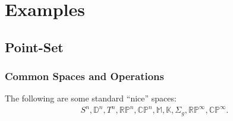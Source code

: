 
\hypertarget{examples}{%
\section{Examples}\label{examples}}

\hypertarget{point-set}{%
\subsection{Point-Set}\label{point-set}}

\hypertarget{common-spaces-and-operations}{%
\subsubsection{Common Spaces and
Operations}\label{common-spaces-and-operations}}

\begin{example}

The following are some standard ``nice'' spaces:
\begin{align*}
S^n, {\mathbb{D}}^n, T^n, {\mathbb{RP}}^n, {\mathbb{CP}}^n, \mathbb{M}, \mathbb{K}, \Sigma_{g}, {\mathbb{RP}}^\infty, {\mathbb{CP}}^\infty
.\end{align*}

\end{example}

